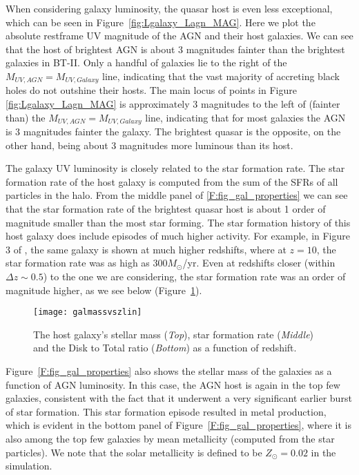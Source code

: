\documentclass[twocolumn,useAMS,usenatbib]{mnras} \usepackage{natbib}
\newcommand{\Msun}{M_{\odot}}
\begin{document}
When considering galaxy luminosity, the quasar host is even less exceptional,
which can be seen in Figure~\ref{fig:Lgalaxy_Lagn_MAG}. 
Here we plot the absolute restframe UV magnitude of the AGN and their host galaxies. We can see that the host of brightest AGN is about 3 magnitudes fainter than the brightest galaxies in BT-II. Only a handful of galaxies lie to the right of the $M_{UV,AGN}=M_{UV,Galaxy}$ line,
indicating that the vast majority of accreting black holes do not outshine their hosts. The main locus of
points in Figure \ref{fig:Lgalaxy_Lagn_MAG} is approximately
3 magnitudes to the left of (fainter than) the $M_{UV,AGN}=M_{UV,Galaxy}$ line, indicating that for most galaxies the AGN is 3 magnitudes fainter the galaxy. The brightest quasar is the opposite, on the other hand, being about 3 magnitudes more luminous than its host.

The galaxy UV luminosity is closely related to the star formation rate.
The star formation rate of the host galaxy is computed from the sum of the SFRs of all particles in the halo. 
From the middle panel of \ref{F:fig_gal_properties} we can see that the 
star formation rate of the brightest quasar host is about 1 order of magnitude smaller than the most
star forming. The star formation history of this host galaxy does  include episodes of much higher activity. For example, in Figure 3 of \cite{2017MNRAS.467.4243D}, the same galaxy is shown at much higher redshifts,
where at $z=10$, the star formation rate was as high as $300 \Msun$/yr. Even at
redshifts closer (within $\Delta z \sim 0.5$) to the one we are considering,
the star formation rate was an order of magnitude higher, as we see below
(Figure~\ref{F:fig_gal_properties1}). 


\begin{figure}
\vspace{-0.11cm}
\texttt{[image: galmassvszlin]}
\vspace{-0.5cm}
\caption{\label{F:fig_gal_properties1} The host galaxy's stellar mass ({\em  Top}), star formation rate ({\em Middle}) and the Disk to Total ratio ({\em Bottom}) as a function of redshift.}  
\end{figure}

Figure~\ref{F:fig_gal_properties} also shows the stellar mass of the galaxies as a function of AGN
luminosity. In this case, the AGN host is again in the
top few galaxies, consistent with the fact that it underwent a
very significant 
earlier burst of star formation. This star formation
episode resulted in metal production, which is evident
in the bottom panel of Figure~\ref{F:fig_gal_properties}, where it is also among the
top few galaxies by mean metallicity (computed from
the star particles). We note that the solar metallicity is defined to be $Z_{\odot}=0.02$ in the simulation.
\end{document}
